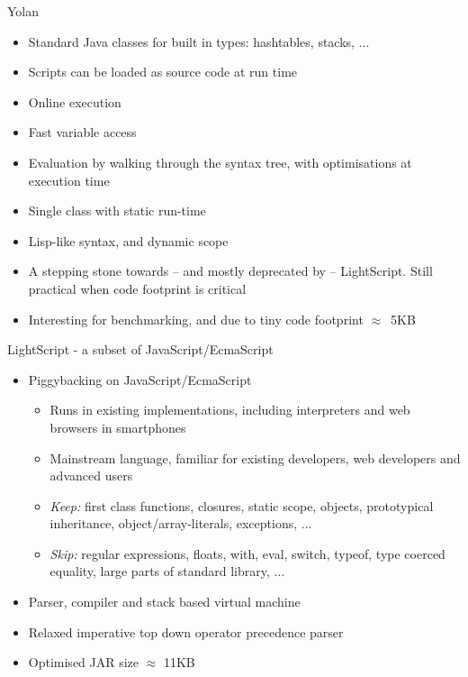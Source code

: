\documentclass[a4paper,landscape]{slides}
\begin{document}
\begin{slide}
	{\large Yolan }
	\begin{itemize} \setlength{\itemsep}{-2mm}
            \item Standard Java classes for built in types: hashtables, stacks, ...
            \item Scripts can be loaded as source code at run time
            \item Online execution
            \item Fast variable access
        \end{itemize}
	\begin{itemize} \setlength{\itemsep}{-2mm}
            \item Evaluation by walking through the syntax tree, with optimisations at execution time
            \item Single class with static run-time
            \item Lisp-like syntax, and dynamic scope
            \item A stepping stone towards -- and mostly deprecated by -- LightScript. Still practical when code footprint is critical
            \item Interesting for benchmarking, and due to tiny code footprint $\approx$~5KB
	\end{itemize}
\end{slide}

\begin{slide}
	{\large 
            LightScript - a subset of JavaScript/EcmaScript 
            }
	\begin{itemize} %
\setlength{\itemsep}{-2mm}
        \item Piggybacking on JavaScript/EcmaScript
	\begin{itemize} \setlength{\itemsep}{0mm}
            \item Runs in existing implementations, including interpreters and web browsers in smartphones
            \item Mainstream language, familiar for existing developers, web developers and advanced users
            \item \emph{Keep:} first class functions, closures, static scope, objects, prototypical inheritance, object/array-literals, exceptions, ...
            \item \emph{Skip:} regular expressions, floats, with, eval, switch, typeof, type coerced equality, large parts of standard library, ...
	\end{itemize}
            \item Parser, compiler and stack based virtual machine
            \item Relaxed imperative top down operator precedence parser
            \item Optimised JAR size $\approx$ 11KB
        \end{itemize}
\end{slide}
\end{document}
